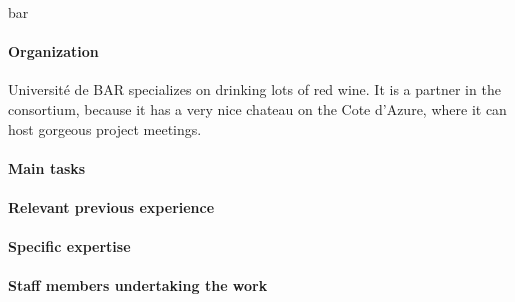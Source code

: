 \begin{sitedescription}{bar}

\paragraph{Organization}
  Universit\'e de BAR specializes on drinking lots of red wine. It is a partner in the
  consortium, because it has a very nice chateau on the Cote d'Azure, where it can host
  gorgeous project meetings.

\paragraph{Main tasks}
\paragraph{Relevant previous experience}
\paragraph{Specific expertise}
\paragraph{Staff members undertaking the work}

\end{sitedescription}

